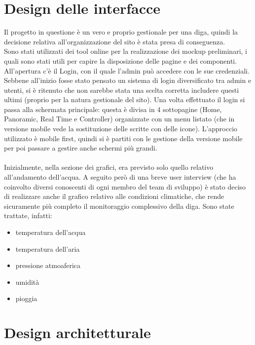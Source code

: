 \documentclass[a4paper,12pt]{report}
\begin{document}
\section{Design delle interfacce}
Il progetto in questione è un vero e proprio gestionale per una diga, quindi la decisione relativa all'organizzazione del sito è stata presa di conseguenza. \\
Sono stati utilizzati dei tool online per la realizzazione dei mockup preliminari, i quali sono stati utili per capire la disposizione delle pagine e dei componenti.\\
All'apertura c'è il Login, con il quale l'admin può accedere con le sue credenziali. Sebbene all'inizio fosse stato pensato un sistema di login diversificato tra admin e utenti, si è ritenuto che non sarebbe stata una scelta corretta includere questi ultimi (proprio per la natura gestionale del sito). Una volta effettuato il login si passa alla schermata principale: questa è divisa in 4 sottopagine (Home, Panoramic, Real Time e Controller) organizzate con un menu listato (che in versione mobile vede la sostituzione delle scritte con delle icone). L'approccio utilizzato è mobile first, quindi si è partiti con le gestione della versione mobile per poi passare a gestire anche schermi più grandi.\\\\
Inizialmente, nella sezione dei grafici, era previsto solo quello relativo all'andamento dell'acqua. A seguito però di una breve user interview (che ha coinvolto diversi conoscenti di ogni membro del team di sviluppo) è stato deciso di realizzare anche il grafico relativo alle condizioni climatiche, che rende sicuramente più completo il monitoraggio complessivo della diga. Sono state trattate, infatti:
\begin{itemize}
    \item temperatura dell'acqua
    \item temperatura dell'aria
    \item pressione atmoaferica
    \item umidità
    \item pioggia
\end{itemize}

\section{Design architetturale}
\end{document}
